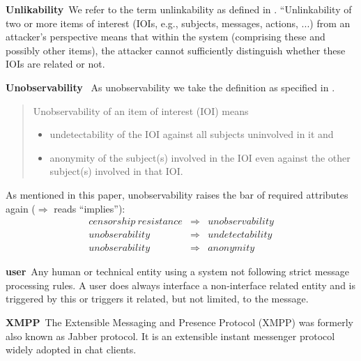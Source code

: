 \documentclass[a4paper,appendixprefix,pdfusetitle,twocolumn,fontsize=8pt,DIV=calc,8pt,draft]{\doctype} %
\newenvironment{entry}{\par\leavevmode\hangpara{1.5mm}{1}\ignorespaces}{\RaggedRight\par}
\newcommand*{\mainentry}[2]{{\bfseries{#1\label{def:#1}}}~#2\par}
\begin{document}
\begin{entry}
	\mainentry{Unlikability}{We refer to the term unlinkability as defined in \cite{anonTerminology}. ``Unlinkability of two or more items of interest (IOIs, e.g., subjects, messages, actions, ...) from an attacker’s perspective means that within the system (comprising these and possibly other items), the attacker cannot sufficiently distinguish whether these IOIs are 
		related or not.}
\end{entry}

\begin{entry}
	\mainentry{Unobservability}{
		As unobservability we take the definition as specified in \cite{anonTerminology}.
		\begin{quote}
			Unobservability of an item of interest (IOI) means
			\begin{itemize}
				\item undetectability of the IOI against all subjects uninvolved in it and
				\item anonymity of the subject(s) involved in the IOI even against the other subject(s) involved in that IOI.
			\end{itemize}
		\end{quote}        
		As mentioned in this paper, unobservability raises the bar of required attributes again ($\Rightarrow$ reads ``implies''):
		\begin{eqnarray*}
			censorship\ resistance & \Rightarrow & unobservability\\
			unobserability         & \Rightarrow & undetectability\\
			unobserability         & \Rightarrow & anonymity
		\end{eqnarray*}
	}
\end{entry}


\begin{entry}
	\mainentry{user}{Any human or technical entity using a system not following strict message processing rules. A user does always interface a non-interface related entity and is triggered by this or triggers it related, but not limited, to the message.}
\end{entry}

\begin{entry}
	\mainentry{XMPP}{The Extensible Messaging and Presence Protocol (XMPP)\cite{RFC6120,RFC6121} was formerly also known as Jabber protocol. It is an extensible instant messenger protocol widely adopted in chat clients.}
\end{entry}
\end{document}
